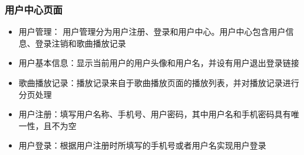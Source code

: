\documentclass[UTF8,14pt]{article}
\numberwithin{figure}{subsubsection}
\numberwithin{table}{subsubsection}
\begin{document}
\subsubsection{用户中心页面}
\begin{itemize}
	\setlength{\itemsep}{0pt}
	      \setlength{\parsep}{0pt}
	      \setlength{\parskip}{0pt}
	\item 用户管理：
	      用户管理分为用户注册、登录和用户中心。用户中心包含用户信息、登录注销和歌曲播放记录
	\item 用户基本信息：显示当前用户的用户头像和用户名，并设有用户退出登录链接
	\item 歌曲播放记录：播放记录来自于歌曲播放页面的播放列表，并对播放记录进行分页处理
	\item 用户注册：填写用户名称、手机号、用户密码，其中用户名和手机密码具有唯一性，且不为空
	\item 用户登录：根据用户注册时所填写的手机号或者用户名实现用户登录
\end{itemize}

\clearpage
\end{document}

